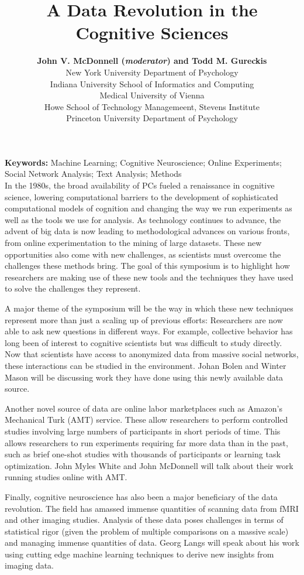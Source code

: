 \documentclass[10pt,letterpaper]{article}
\title{A Data Revolution in the Cognitive Sciences}
\author{{\large \bf John V. McDonnell (\emph{moderator}) and Todd M. Gureckis}  \\
  New York University Department of Psychology
  \AND {\large \bf Johan Bolen} \\
  Indiana University School of Informatics and Computing
  \AND {\large \bf Georg Langs} \\
  Medical University of Vienna
  \AND {\large \bf Winter Mason, Meeyoung Cha, Krishna Gummadi, Farshad Kooti, and Haeryun Yang} \\
  Howe School of Technology Managemeent, Stevens Institute 
  \AND {\large \bf John Myles White} \\
  Princeton University Department of Psychology }
\begin{document}
\maketitle


\textbf{Keywords:} 
Machine Learning; Cognitive Neuroscience; Online Experiments; Social Network
Analysis; Text Analysis; Methods\\

In the 1980s, the broad availability of PCs fueled a renaissance in cognitive
science, lowering computational barriers to the development of sophisticated
computational models of cognition and changing the way we run experiments as well
as the tools we use for analysis. As technology continues to advance, the advent
of big data is now leading to methodological advances on various fronts, from
online experimentation to the mining of large datasets. These new opportunities
also come with new challenges, as scientists must overcome the challenges these
methods bring. The goal of this symposium is to highlight how researchers are
making use of these new tools and the techniques they have used to solve the
challenges they represent. 

A major theme of the symposium will be the way in which these new techniques
represent more than just a scaling up of previous efforts: Researchers are now
able to ask new questions in different ways. For example, collective behavior has
long been of interest to cognitive scientists but was difficult to study
directly. Now that scientists have access to anonymized data from massive social
networks, these interactions can be studied in the environment. Johan Bolen and
Winter Mason will be discussing work they have done using this newly available
data source.

Another novel source of data are online labor marketplaces such as Amazon's
Mechanical Turk (AMT) service. These allow researchers to perform controlled
studies involving large numbers of participants in short periods of time. This
allows researchers to run experiments requiring far more data than in the past,
such as brief one-shot studies with thousands of participants or learning task
optimization. John Myles White and John McDonnell will talk about their work
running studies online with AMT.

Finally, cognitive neuroscience has also been a major beneficiary of the data
revolution.  The field has amassed immense quantities of scanning data from fMRI
and other imaging studies.  Analysis of these data poses challenges in terms of
statistical rigor (given the problem of multiple comparisons on a massive scale)
and managing immense quantities of data. Georg Langs will speak about his work
using cutting edge machine learning techniques to derive new insights from
imaging data.
\end{document}

